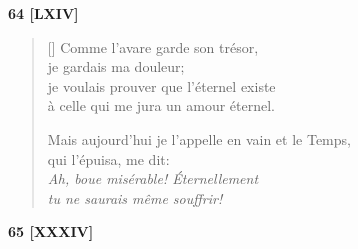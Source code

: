\documentclass[a4paper,12pt]{book}
\begin{document}
\bigskip

\begin{center}
  \textbf{64 [LXIV]}
\end{center}

\settowidth{\versewidth}{Mais aujourd'hui en vain je l'appelle et le Temps,}

\begin{verse}[\versewidth]
  Comme l'avare garde son trésor, \\
  je gardais ma douleur; \\
  je voulais prouver que l'éternel existe \\
  à celle qui me jura un amour éternel.

  Mais aujourd'hui je l'appelle en vain et le Temps, \\
  qui l'épuisa, me dit: \\
  \emph{Ah, boue misérable! Éternellement \\
    tu ne saurais même souffrir!}
\end{verse}

\bigskip

\begin{center}
  \textbf{65 [XXXIV]}
\end{center}

\settowidth{\versewidth}{flamboient d'un nouvel éclat dans ses pupilles.}
\end{document}
